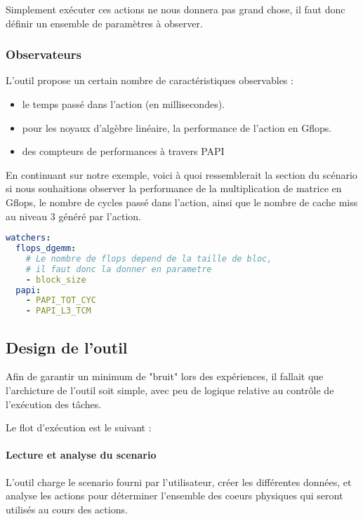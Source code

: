 Simplement exécuter ces actions ne nous donnera pas grand chose, il faut donc définir un ensemble de paramètres à observer.

\subsubsection{Observateurs}

L'outil propose un certain nombre de caractéristiques observables :

\begin{itemize}
  \item le temps passé dans l'action (en millisecondes).
  \item pour les noyaux d'algèbre linéaire, la performance de l'action en Gflops.
  \item des compteurs de performances à travers PAPI
\end{itemize}

En continuant sur notre exemple, voici à quoi ressemblerait la section du scénario si nous souhaitions observer la performance de la multiplication de matrice en Gflops, le nombre de cycles passé dans l'action, ainsi que le nombre de cache miss au niveau 3 généré par l'action.

\begin{lstlisting}[language=yaml,caption=Exemple de déclaration d'observateurs,label=lst:tool:watchers-example]
watchers:
  flops_dgemm:
    # Le nombre de flops depend de la taille de bloc,
    # il faut donc la donner en parametre
    - block_size
  papi:
    - PAPI_TOT_CYC
    - PAPI_L3_TCM
\end{lstlisting}

\subsection{Design de l'outil}

Afin de garantir un minimum de "bruit" lors des expériences, il fallait que l'archicture de l'outil soit simple, avec peu de logique relative au contrôle de l'exécution des tâches.

Le flot d'exécution est le suivant :

\paragraph{Lecture et analyse du scenario}
L'outil charge le scenario fourni par l'utilisateur, créer les différentes données, et analyse les actions pour déterminer l'ensemble des coeurs physiques qui seront utilisés au cours des actions.

